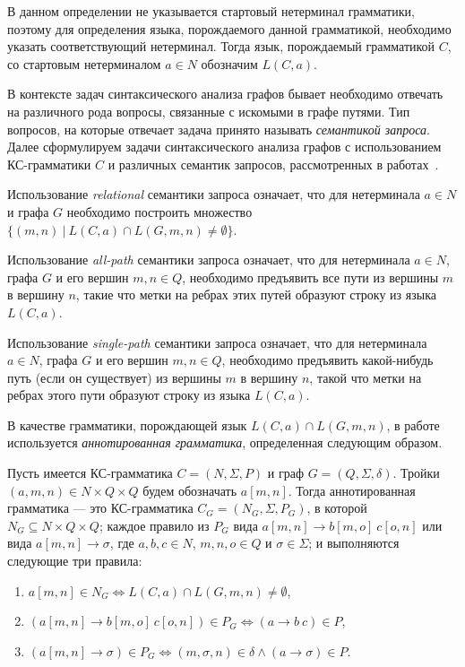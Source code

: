 В данном определении не указывается стартовый нетерминал грамматики, поэтому для определения языка, порождаемого данной грамматикой, необходимо указать соответствующий нетерминал. Тогда язык, порождаемый грамматикой $C$, со стартовым нетерминалом $a \in N$ обозначим $L(C,a)$.

В контексте задач синтаксического анализа графов бывает необходимо отвечать на различного рода вопросы, связанные с искомыми в графе путями. Тип вопросов, на которые отвечает задача принято называть \textit{семантикой запроса}. Далее сформулируем задачи синтаксического анализа графов с использованием КС-грамматики $C$ и различных семантик запросов, рассмотренных в работах~\cite{azimov-spbu-hellings1, azimov-spbu-hellings2}.

Использование \textit{relational} семантики запроса означает, что для нетерминала $a \in N$ и графа $G$ необходимо построить множество $\{(m, n)~|~L(C,a) \cap L(G,m,n) \neq \emptyset \}$.

Использование \textit{all-path} семантики запроса означает, что для нетерминала $a \in N$, графа $G$ и его вершин $m,n \in Q$, необходимо предъявить все пути из вершины $m$ в вершину $n$, такие что метки на ребрах этих путей образуют строку из языка $L(C,a)$.

Использование \textit{single-path} семантики запроса означает, что для нетерминала $a \in N$, графа $G$ и его вершин $m,n \in Q$, необходимо предъявить какой-нибудь путь (если он существует) из вершины $m$ в вершину $n$, такой что метки на ребрах этого пути образуют строку из языка $L(C,a)$.

В качестве грамматики, порождающей язык $L(C,a) \cap L(G,m,n)$, в работе~\cite{azimov-spbu-hellings2} используется \textit{аннотированная грамматика}, определенная следующим образом.

\begin{mydef}
Пусть имеется КС-грамматика $C = (N,\Sigma,P)$ и граф $G = (Q,\Sigma,\delta)$. Тройки $(a,m,n) \in N \times Q \times Q$ будем обозначать $a[m,n]$. Тогда аннотированная грамматика --- это КС-грамматика $C_{G} = (N_{G}, \Sigma, P_{G})$, в которой $N_{G} \subseteq N \times Q \times Q$; каждое правило из $P_{G}$ вида $a[m,n] \rightarrow b[m,o]~c[o,n]$ или вида $a[m,n] \rightarrow \sigma$, где $a,b,c \in N$, $m, n, o \in Q$ и $\sigma \in \Sigma$; и выполняются следующие три правила:

\begin{enumerate}
\item $a[m,n] \in N_{G} \Leftrightarrow L(C,a) \cap L(G,m,n) \neq \emptyset$,
\item $(a[m,n] \rightarrow b[m,o]~c[o,n]) \in P_{G} \Leftrightarrow (a \rightarrow b~c) \in P$,
\item $(a[m,n] \rightarrow \sigma) \in P_{G} \Leftrightarrow (m, \sigma, n) \in \delta \wedge (a \rightarrow \sigma) \in P$.
\end{enumerate}

\end{mydef}

